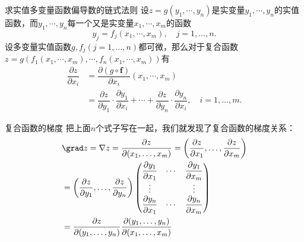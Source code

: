 
\begin{frame}

\begin{block}{求实值多变量函数偏导数的链式法则}
设$z = g(y_1,\cdots,y_n)$是实变量$y_1,\cdots,y_n$的实值函数，而$y_1,\cdots,y_n$每一个又是实变量$x_1,\cdots,x_m$的函数
\[y_j = f_j(x_1,\cdots,x_m), \quad j = 1,\ldots,n.\]
设多变量实值函数$g,f_j(j = 1,\ldots,n)$都可微，那么对于复合函数$z=g(f_1(x_1,\cdots,x_m),\cdots,f_n(x_1,\cdots,x_m))$有
\begin{align*}
\dfrac{\partial z}{\partial x_i} & = \dfrac{\partial (g\circ \mathbf{f})}{\partial x_i}(x_1,\cdots,x_m) \\
& = \dfrac{\partial z}{\partial y_1} \cdot \dfrac{\partial y_1}{\partial x_i} + \cdots + \dfrac{\partial z}{\partial y_n} \cdot \dfrac{\partial y_n}{\partial x_i}, \quad i = 1,\ldots,m.
\end{align*}
\end{block}

\end{frame}


\begin{frame}

\begin{block}{复合函数的梯度}
把上面$n$个式子写在一起，我们就发现了复合函数的梯度关系：
\begin{align*}
& \grad z = \nabla z = \dfrac{\partial z}{\partial(x_1,\ldots,x_m)} = \left( \dfrac{\partial z}{\partial x_1}, \ldots, \dfrac{\partial z}{\partial x_m}\right) \\
& = \left( \dfrac{\partial z}{\partial y_1}, \ldots, \dfrac{\partial z}{\partial y_n}\right) \begin{pmatrix}
\dfrac{\partial y_1}{\partial x_1} & \cdots & \dfrac{\partial y_1}{\partial x_m} \\
\vdots & & \vdots \\
\dfrac{\partial y_n}{\partial x_1} & \cdots & \dfrac{\partial y_n}{\partial x_m}
\end{pmatrix} \\
& = \dfrac{\partial z}{\partial(y_1,\ldots,y_n)} \dfrac{\partial(y_1,\ldots,y_n)}{\partial(x_1,\ldots,x_m)}
\end{align*}
\end{block}

\end{frame}


